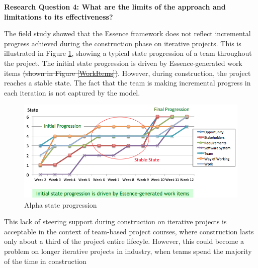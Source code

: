 \documentclass[preprint,12pt,3p]{elsarticle}
\begin{document}
\textbf{Research Question 4: What are the limits of the approach and limitations to its effectiveness?}

The field study showed that the Essence framework does not reflect incremental progress achieved during the  construction phase on iterative projects. This is illustrated in Figure \ref{AlphaStateProgression}, showing a typical state progression of a team throughout the project. The initial state progression is driven by Essence-generated work items \sout{(shown in Figure \ref{WorkItems})}. However, during construction, the project reaches a stable state. The fact that the team is making incremental progress in each iteration is not captured by the model. 

\begin{figure}[h]\vspace*{4pt}
\centerline{\includegraphics[width=5.4in]{field_study_images/AlphaStateProgression}}
\caption{Alpha state progression}\vspace*{-6pt}\label{AlphaStateProgression}
\end{figure}


This lack of steering support during construction on iterative projects is acceptable in the context of team-based project courses, where construction lasts only about a third of the project entire lifecyle. However, this could become a problem on longer iterative projects in industry, when teams spend the majority of the time in construction

\end{document}
